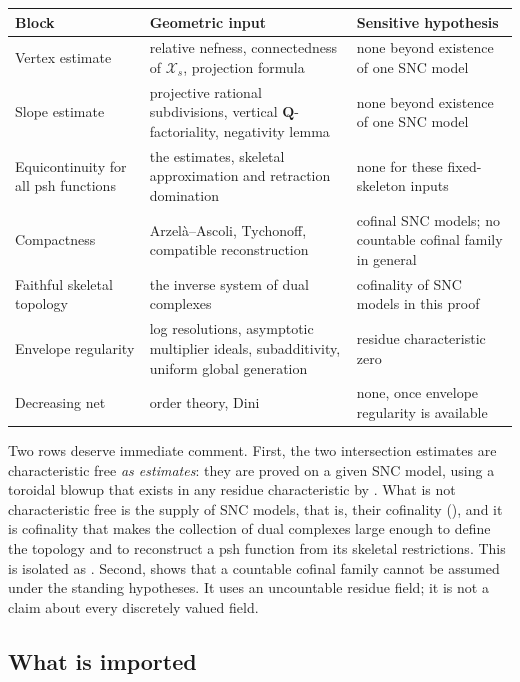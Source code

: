 \begin{center}
\small
\begin{tabular}{p{}p{}p{}}
\toprule
Block & Geometric input & Sensitive hypothesis\\
\midrule
Vertex estimate
 & relative nefness, connectedness of $\mathcal X_s$,
   projection formula
 & none beyond existence of one SNC model\\
Slope estimate
 & projective rational subdivisions, vertical
   $\mathbf Q$-factoriality, negativity lemma
 & none beyond existence of one SNC model\\
Equicontinuity for all psh functions
 & the estimates, skeletal approximation and retraction domination
 & none for these fixed-skeleton inputs\\
Compactness
 & Arzel\`a--Ascoli, Tychonoff, compatible reconstruction
 & cofinal SNC models; no countable cofinal family in general\\
Faithful skeletal topology
 & the inverse system of dual complexes
 & cofinality of SNC models in this proof\\
Envelope regularity
 & log resolutions, asymptotic multiplier ideals, subadditivity,
   uniform global generation
 & residue characteristic zero\\
Decreasing net
 & order theory, Dini
 & none, once envelope regularity is available\\
\bottomrule
\end{tabular}
\end{center}

Two rows deserve immediate comment.  First, the two intersection estimates
are characteristic free \emph{as estimates}: they are proved on a given SNC
model, using a toroidal blowup that exists in any residue characteristic by
.  What is not characteristic free is the
supply of SNC models, that is, their cofinality
(), and it is cofinality that
makes the collection of dual complexes large enough to define the topology
and to reconstruct a psh function from its skeletal restrictions.  This is
isolated as .  Second,
 shows that a countable cofinal family
cannot be assumed under the standing hypotheses.  It uses an uncountable
residue field; it is not a claim about every discretely valued field.

\subsection{What is imported}
\label{sec:ch22-imports}

